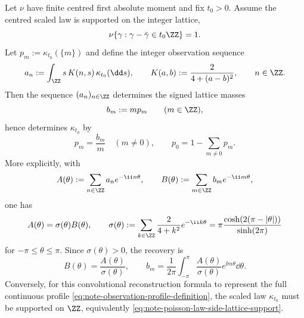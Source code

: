 \begin{theorem}%
\label{thm:note-poisson-observation-lattice-sampling}
\label{prop:note-poisson-law-lattice-periodicity}
Let \(\nu\) have finite centred first absolute moment and fix \(t_0>0\).
Assume the centred scaled law is supported on the integer lattice,
\begin{equation}\label{eq:note-poisson-law-side-lattice-support}
\nu\{\gamma:\gamma-\bar{\gamma}\in t_0\ZZ\}=1 .
\end{equation}
Let \(p_m:=\kappa_{t_0}(\{m\})\) and define the integer observation sequence
\begin{equation}\label{eq:note-integer-observation-samples}
a_n:=
\int_{\ZZ} s\,K(n,s)\,\kappa_{t_0}(\dd s),
\qquad
K(a,b):=\frac{2}{4+(a-b)^2},
\qquad n\in\ZZ .
\end{equation}
Then the sequence \((a_n)_{n\in\ZZ}\) determines the signed lattice masses
\[
b_m:=m p_m\qquad(m\in\ZZ),
\]
hence determines \(\kappa_{t_0}\) by
\[
p_m=\frac{b_m}{m}\quad(m\ne0),
\qquad
p_0=1-\sum_{m\ne0}p_m .
\]
More explicitly, with
\[
A(\theta):=\sum_{n\in\ZZ}a_ne^{-\ii n\theta},
\qquad
B(\theta):=\sum_{m\in\ZZ}b_me^{-\ii m\theta},
\]
one has
\begin{equation}\label{eq:note-lattice-symbol}
A(\theta)=\sigma(\theta)B(\theta),\qquad
\sigma(\theta):=\sum_{k\in\ZZ}\frac{2}{4+k^2}e^{-\ii k\theta}
=\pi\frac{\cosh(2(\pi-|\theta|))}{\sinh(2\pi)}
\end{equation}
for \(-\pi\le\theta\le\pi\).  Since \(\sigma(\theta)>0\), the recovery is
\[
B(\theta)=\frac{A(\theta)}{\sigma(\theta)},\qquad
b_m=\frac{1}{2\pi}\int_{-\pi}^{\pi}
\frac{A(\theta)}{\sigma(\theta)}e^{\ii m\theta}\dd\theta .
\]
Conversely, for this convolutional reconstruction formula to represent the
full continuous profile \eqref{eq:note-observation-profile-definition}, the
scaled law \(\kappa_{t_0}\) must be supported on \(\ZZ\), equivalently
\eqref{eq:note-poisson-law-side-lattice-support}.
\end{theorem}

